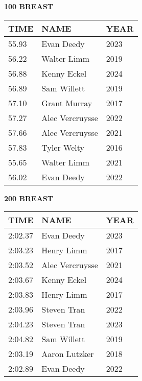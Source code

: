 \begin{minipage}[t]{0.48\textwidth}
\centering
\textbf{100 BREAST}\\[0.05cm]
\begin{tabular}{@{}p{1.8cm}p{2.8cm}p{1.2cm}@{}}
\hline
\textbf{TIME} & \textbf{NAME} & \textbf{YEAR} \\
\hline
55.93 & Evan Deedy & 2023 \\
56.22 & Walter Limm & 2019 \\
56.88 & Kenny Eckel & 2024 \\
56.89 & Sam Willett & 2019 \\
57.10 & Grant Murray & 2017 \\
57.27 & Alec Vercruysse & 2022 \\
57.66 & Alec Vercruysse & 2021 \\
57.83 & Tyler Welty & 2016 \\
55.65 & Walter Limm & 2021 \\
56.02 & Evan Deedy & 2022 \\
\hline
\end{tabular}
\end{minipage}\hfill
\begin{minipage}[t]{0.48\textwidth}
\centering
\textbf{200 BREAST}\\[0.05cm]
\begin{tabular}{@{}p{1.8cm}p{2.8cm}p{1.2cm}@{}}
\hline
\textbf{TIME} & \textbf{NAME} & \textbf{YEAR} \\
\hline
2:02.37 & Evan Deedy & 2023 \\
2:03.23 & Henry Limm & 2017 \\
2:03.52 & Alec Vercruysse & 2021 \\
2:03.67 & Kenny Eckel & 2024 \\
2:03.83 & Henry Limm & 2017 \\
2:03.96 & Steven Tran & 2022 \\
2:04.23 & Steven Tran & 2023 \\
2:04.82 & Sam Willett & 2019 \\
2:03.19 & Aaron Lutzker & 2018 \\
2:02.89 & Evan Deedy & 2022 \\
\hline
\end{tabular}
\end{minipage}

\vspace{0.4cm}

